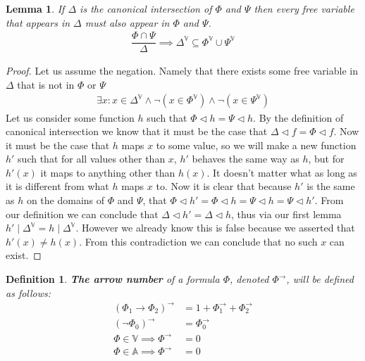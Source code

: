 \documentclass{article}
\newtheorem{lem}{Lemma}
\newtheorem{defin}{Definition}
\begin{document}
\begin{lem}
If $\Delta$ is the canonical intersection of $\Phi$ and $\Psi$ then every free variable that appears in $\Delta$ must also appear in $\Phi$ and $\Psi$.
\begin{align*}
\dfrac{\Phi\cap\Psi}{\Delta}\implies\Delta^\mathbb{V}\subseteq\Phi^\mathbb{V}\cup\Psi^\mathbb{V}
\end{align*}
\end{lem}
\begin{proof}
Let us assume the negation.
Namely that there exists some free variable in $\Delta$ that is not in $\Phi$ or $\Psi$
\begin{align*}
\exists x : x \in \Delta^\mathbb{V} \land \neg (x \in \Phi^\mathbb{V}) \land \neg (x \in \Psi^\mathbb{V})
\end{align*}
Let us consider some function $h$ such that $\Phi\lhd h=\Psi\lhd h$.
By the definition of canonical intersection we know that it must be the case that $\Delta\lhd f = \Phi\lhd f$.
Now it must be the case that $h$ maps $x$ to some value, so we will make a new function $h'$ such that
for all values other than $x$, $h'$ behaves the same way as $h$, but for $h'(x)$ it maps to anything other than $h(x)$.
It doesn't matter what as long as it is different from what $h$ maps $x$ to.
Now it is clear that because $h'$ is the same as $h$ on the domains of $\Phi$ and $\Psi$, that $\Phi\lhd h' = \Phi\lhd h = \Psi\lhd h = \Psi\lhd h'$.
From our definition we can conclude that $\Delta \lhd h' = \Delta \lhd h$, thus via our first lemma $h' \mid \Delta^\mathbb{V} = h \mid \Delta^\mathbb{V}$.
However we already know this is false because we asserted that $h'(x) \neq h(x)$.
From this contradiction we can conclude that no such $x$ can exist.

\end{proof}

\begin{defin}
\textbf{The arrow number} of a formula $\Phi$, denoted $\Phi^\rightarrow$, will be defined as follows:
\begin{align*}
(\Phi_1\rightarrow\Phi_2)^\rightarrow &= 1 + \Phi_1^\rightarrow + \Phi_2^\rightarrow \\
(\neg\Phi_0)^\rightarrow &= \Phi_0^\rightarrow \\
\Phi \in \mathbb{V} \implies \Phi^\rightarrow &= 0\\
\Phi \in \mathbb{A} \implies \Phi^\rightarrow &= 0
\end{align*}
\end{defin}
\end{document}
